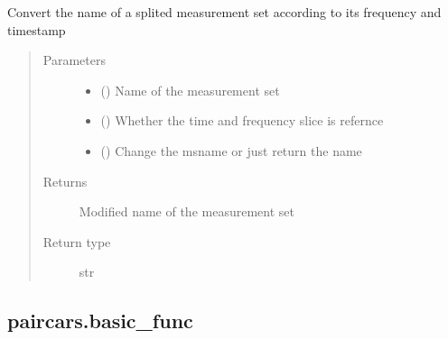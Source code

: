 \documentclass[letterpaper,10pt,english]{sphinxmanual}
\begin{document}

\begin{fulllineitems}
\label{\detokenize{paircars:paircars.access_ms.splited_ms_rename}}
\sphinxAtStartPar
Convert the name of a splited measurement set according to its frequency and timestamp
\begin{quote}\begin{description}
\item[{Parameters}] \leavevmode\begin{itemize}
\item {} 
\sphinxAtStartPar
{} () \textendash{} Name of the measurement set

\item {} 
\sphinxAtStartPar
{} () \textendash{} Whether the time and frequency slice is refernce

\item {} 
\sphinxAtStartPar
{} () \textendash{} Change the msname or just return the name

\end{itemize}

\item[{Returns}] \leavevmode
\sphinxAtStartPar
Modified name of the measurement set

\item[{Return type}] \leavevmode
\sphinxAtStartPar
str

\end{description}\end{quote}

\end{fulllineitems}



\subsection{paircars.basic\_func}
\label{\detokenize{paircars:module-paircars.basic_func}}\label{\detokenize{paircars:paircars-basic-func}}
\end{document}
